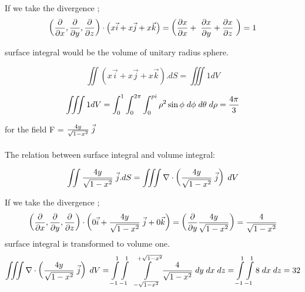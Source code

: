 \documentclass[11pt]{article}
\begin{document}
If we take the divergence ; 
$$\left( \frac{\partial}{\partial x} , \frac{\partial}{\partial y } ,\frac{\partial}{\partial z} \right) \cdot \left( x \vec{i} + x \vec{j} + x \vec{k} \right) = \left( \frac{\partial x }{\partial x}  + \hspace{0.1cm} \frac{\partial x }{\partial y }  + \frac{\partial x }{\partial z} \hspace{0.1cm}  \right) = 1  $$

surface integral would be the volume of unitary radius sphere.

$$\iint (x \vec{i} + x \vec{j} + x \vec{k}).dS = \iiint 1  dV $$

$$\iiint 1  dV = \int_{0}^{1} \int_{0}^{2\pi} \int_{0}^{pi} \rho^{2} \sin\phi \hspace{0.1cm} d\phi   \hspace{0.1cm} d\theta \hspace{0.1cm} d\rho  = \frac{4 \pi}{3} \vspace{0.1cm}$$


for the field  F = $\frac{4y}{\sqrt{1-x^{2}}} \hspace{0.1cm} \vec{j}$\\\\

The relation between surface integral and volume integral:

$$\iint \frac{4y}{\sqrt{1-x^{2}}} \hspace{0.1cm} \vec{j} .dS = \iiint \nabla \cdot \left( \frac{4y}{\sqrt{1-x^{2}}} \hspace{0.1cm} \vec{j} \right) \hspace{0.1cm} dV $$

If we take the divergence ; 
$$\left( \frac{\partial}{\partial x} , \frac{\partial}{\partial y } ,\frac{\partial}{\partial z} \right) \cdot \left( 0 \vec{i} + \frac{4y}{\sqrt{1-x^{2}}} \hspace{0.1cm} \vec{j}  + 0 \vec{k} \right) = \left(    \frac{\partial  }{\partial y }  \frac{4y}{\sqrt{1-x^{2}}}  \right) = \frac{4}{\sqrt{1-x^{2}}}  $$
surface integral is transformed to volume one.
$$ \iiint \nabla \cdot \left( \frac{4y}{\sqrt{1-x^{2}}} \hspace{0.1cm} \vec{j} \right) \hspace{0.1cm} dV = \int\limits_{-1}^{1} \int\limits_{-1}^{1} \hspace{0.2cm} \int\limits_{-\sqrt{1-x^{2}}}^{+\sqrt{1-x^{2}}} \frac{4}{\sqrt{1-x^{2}}} \hspace{0.1cm} dy \hspace{0.1cm} dx \hspace{0.1cm} dz = \int\limits_{-1}^{1} \int\limits_{-1}^{1} 8 \hspace{0.1cm} dx \hspace{0.1cm} dz = 32 $$
\end{document}
